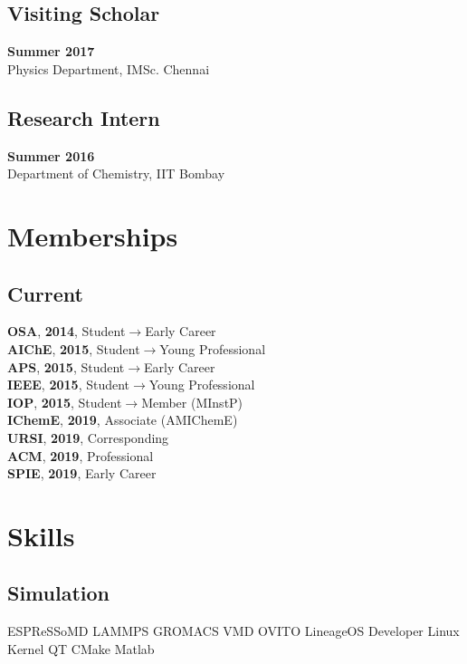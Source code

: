 \documentclass[letterpaper]{deedy-resume} %
\begin{document}
\begin{minipage}[t]{0.36\textwidth}
	\subsection{Visiting Scholar}
	\textbf{Summer 2017}\\ Physics Department, IMSc. Chennai
	\subsection{Research Intern}
	\textbf{Summer 2016}\\ Department of Chemistry, IIT Bombay


	\section{Memberships}
	\subsection{Current}
	\textbf{OSA}, \textbf{2014}, Student$\to$Early Career\\
	\textbf{AIChE}, \textbf{2015}, Student$\to$Young Professional\\
	\textbf{APS}, \textbf{2015}, Student$\to$Early Career\\
	\textbf{IEEE}, \textbf{2015}, Student$\to$Young Professional\\
	\textbf{IOP}, \textbf{2015}, Student$\to$Member (MInstP)\\
	\textbf{IChemE}, \textbf{2019}, Associate (AMIChemE)\\
	\textbf{URSI}, \textbf{2019}, Corresponding \\
	\textbf{ACM}, \textbf{2019}, Professional \\
	\textbf{SPIE}, \textbf{2019}, Early Career \\



	\section{Skills}
	\subsection{Simulation}
	ESPReSSoMD \textbullet{} LAMMPS \textbullet{} GROMACS \textbullet{} VMD \textbullet{} OVITO\textbullet{} LineageOS Developer\textbullet{} Linux Kernel\textbullet{} QT\textbullet{} CMake\textbullet{} Matlab\\

\end{minipage}
\end{document}
